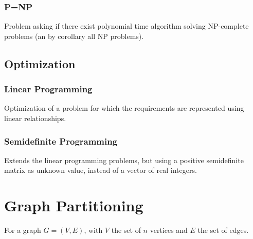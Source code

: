 \documentclass[12pt,a4paper]{article}
\theoremstyle{customdef}
\begin{document}
\subsubsection{P=NP}
Problem asking if there exist polynomial time algorithm solving NP-complete problems (an by corollary all NP problems).

\subsection{Optimization}

\subsubsection{Linear Programming}
Optimization of a problem for which the requirements are represented using linear relationships.

\subsubsection{Semidefinite Programming}
Extends the linear programming problems, but using a positive semidefinite matrix as unknown value, instead of a vector of real integers.








\section{Graph Partitioning}
For a graph $G = (V, E)$, with $V$ the set of $n$ vertices and $E$ the set of edges.
\end{document}
